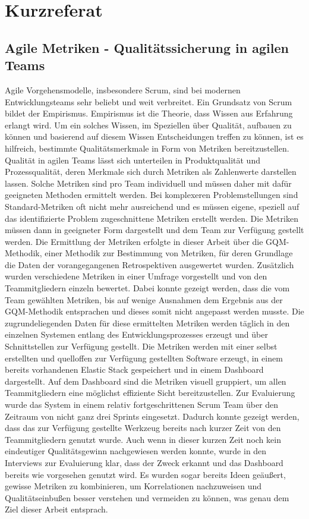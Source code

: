 \newpage
\chapter*{Kurzreferat}
\section*{Agile Metriken {-} Qualitätssicherung in agilen Teams}

Agile Vorgehensmodelle, insbesondere Scrum, sind bei modernen Entwicklungsteams sehr beliebt und weit verbreitet.
Ein Grundsatz von Scrum bildet der Empirismus. 
Empirismus ist die Theorie, dass Wissen aus Erfahrung erlangt wird.
Um ein solches Wissen, im Speziellen über Qualität, aufbauen zu können und basierend auf diesem Wissen Entscheidungen treffen zu können, ist es hilfreich, bestimmte Qualitätsmerkmale in Form von Metriken bereitzustellen.
Qualität in agilen Teams lässt sich unterteilen in Produktqualität und Prozessqualität, deren Merkmale sich durch Metriken als Zahlenwerte darstellen lassen.
Solche Metriken sind pro Team individuell und müssen daher mit dafür geeigneten Methoden ermittelt werden.
Bei komplexeren Problemstellungen sind Standard-Metriken oft nicht mehr ausreichend und es müssen eigene, speziell auf das identifizierte Problem zugeschnittene Metriken erstellt werden.
Die Metriken müssen dann in geeigneter Form dargestellt und dem Team zur Verfügung gestellt werden.
Die Ermittlung der Metriken erfolgte in dieser Arbeit über die \acf{GQM}-Methodik, einer Methodik zur Bestimmung von Metriken, für deren Grundlage die Daten der vorangegangenen Retrospektiven ausgewertet wurden.
Zusätzlich wurden verschiedene Metriken in einer Umfrage vorgestellt und von den Teammitgliedern einzeln bewertet.
Dabei konnte gezeigt werden, dass die vom Team gewählten Metriken, bis auf wenige Ausnahmen dem Ergebnis aus der \ac{GQM}-Methodik entsprachen und dieses somit nicht angepasst werden musste.
Die zugrundeliegenden Daten für diese ermittelten Metriken werden täglich in den einzelnen Systemen entlang des Entwicklungsprozesses erzeugt und über Schnittstellen zur Verfügung gestellt.
Die Metriken werden mit einer selbst erstellten und quelloffen zur Verfügung gestellten Software erzeugt, in einem bereits vorhandenen Elastic Stack gespeichert und in einem Dashboard dargestellt.
Auf dem Dashboard sind die Metriken visuell gruppiert, um allen Teammitgliedern eine möglichst effiziente Sicht bereitzustellen.
Zur Evaluierung wurde das System in einem relativ fortgeschrittenen Scrum Team über den Zeitraum von nicht ganz drei Sprints eingesetzt.
Dadurch konnte gezeigt werden, dass das zur Verfügung gestellte Werkzeug bereits nach kurzer Zeit von den Teammitgliedern genutzt wurde.
Auch wenn in dieser kurzen Zeit noch kein eindeutiger Qualitätsgewinn nachgewiesen werden konnte, wurde in den Interviews zur Evaluierung klar, dass der Zweck erkannt und das Dash\-board bereits wie vorgesehen genutzt wird.
Es wurden sogar bereits Ideen geäußert, gewisse Metriken zu kombinieren, um Korrelationen nachzuweisen und Qualitätseinbußen besser verstehen und vermeiden zu können, was genau dem Ziel dieser Arbeit entsprach.

